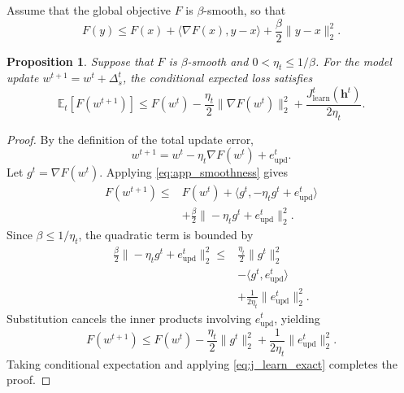 \documentclass[5p,times]{elsarticle}
\theoremstyle{plain}
\newtheorem{proposition}[theorem]{Proposition}
\theoremstyle{definition}
\theoremstyle{remark}
\begin{document}
Assume that the global objective
\(F\) is \(\beta\)-smooth, so that
\begin{equation}
F(y)
\le
F(x)+
\langle\nabla F(x),y-x\rangle
+
\frac{\beta}{2}\|y-x\|_2^2.
\label{eq:app_smoothness}
\end{equation}

\begin{proposition}
\label{prop:learning_bound}
Suppose that \(F\) is
\(\beta\)-smooth and
\(0<\eta_t\le 1/\beta\).
For the model update
\(w^{t+1}=w^t+\Delta_s^t\),
the conditional expected loss satisfies
\begin{equation}
\mathbb E_t[F(w^{t+1})]
\le
F(w^t)
-
\frac{\eta_t}{2}
\|\nabla F(w^t)\|_2^2
+
\frac{
J_{\mathrm{learn}}^t(\mathbf h^t)
}{2\eta_t}.
\label{eq:app_expected_descent}
\end{equation}
\end{proposition}

\begin{proof}
By the definition of the total update
error,
\begin{equation}
w^{t+1}
=
w^t-\eta_t\nabla F(w^t)
+e_{\mathrm{upd}}^t.
\end{equation}
Let \(g^t=\nabla F(w^t)\).
Applying \eqref{eq:app_smoothness}
gives
\begin{equation}
\begin{aligned}
F(w^{t+1})
\le {}&
F(w^t)
+
\langle g^t,
-\eta_tg^t+e_{\mathrm{upd}}^t
\rangle\\
&+
\frac{\beta}{2}
\|-\eta_tg^t+e_{\mathrm{upd}}^t\|_2^2.
\end{aligned}
\end{equation}
Since \(\beta\le 1/\eta_t\),
the quadratic term is bounded by
\begin{equation}
\begin{aligned}
\frac{\beta}{2}
\|-\eta_tg^t+e_{\mathrm{upd}}^t\|_2^2
\le {}&
\frac{\eta_t}{2}\|g^t\|_2^2\\
&-
\langle g^t,e_{\mathrm{upd}}^t\rangle\\
&+
\frac{1}{2\eta_t}
\|e_{\mathrm{upd}}^t\|_2^2.
\end{aligned}
\end{equation}
Substitution cancels the inner
products involving
\(e_{\mathrm{upd}}^t\), yielding
\begin{equation}
F(w^{t+1})
\le
F(w^t)
-
\frac{\eta_t}{2}\|g^t\|_2^2
+
\frac{1}{2\eta_t}
\|e_{\mathrm{upd}}^t\|_2^2.
\end{equation}
Taking conditional expectation
and applying
\eqref{eq:j_learn_exact}
completes the proof.
\end{proof}
\end{document}
